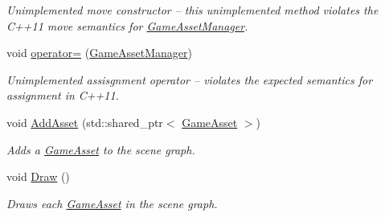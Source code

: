 \begin{DoxyCompactItemize}
\begin{DoxyCompactList}\small\item\em Unimplemented move constructor -- this unimplemented method violates the C++11 move semantics for \hyperlink{classGameAssetManager}{Game\+Asset\+Manager}. \end{DoxyCompactList}\item 
void \hyperlink{classGameAssetManager_a7c9e4fce50b47b78652e7ff0b4dbb629}{operator=} (\hyperlink{classGameAssetManager}{Game\+Asset\+Manager})
\begin{DoxyCompactList}\small\item\em Unimplemented assisgnment operator -- violates the expected semantics for assignment in C++11. \end{DoxyCompactList}\item 
void \hyperlink{classGameAssetManager_ad3de8ff00d55ba04728b1de8213b2349}{Add\+Asset} (std\+::shared\+\_\+ptr$<$ \hyperlink{classGameAsset}{Game\+Asset} $>$)
\begin{DoxyCompactList}\small\item\em Adds a \hyperlink{classGameAsset}{Game\+Asset} to the scene graph. \end{DoxyCompactList}\item 
void \hyperlink{classGameAssetManager_a32837132bd70a9a9ed537323c2d3d886}{Draw} ()
\begin{DoxyCompactList}\small\item\em Draws each \hyperlink{classGameAsset}{Game\+Asset} in the scene graph. \end{DoxyCompactList}\end{DoxyCompactItemize}
